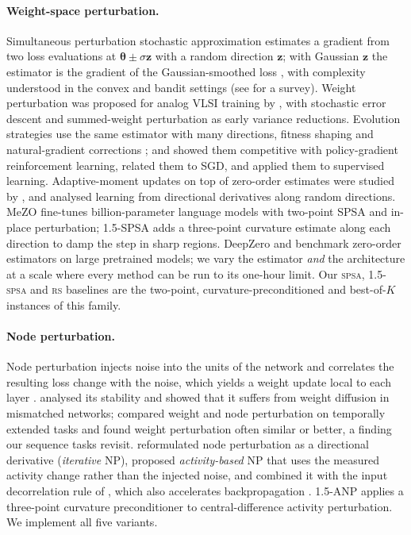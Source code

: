 \documentclass{article}
\newcommand{\method}[1]{\textsc{#1}}
\newcommand{\SPSA}{\method{spsa}}
\newcommand{\SPSAb}{\method{1.5-spsa}}
\newcommand{\RS}{\method{rs}}
\newcommand{\btheta}{\boldsymbol{\theta}}
\newcommand{\bz}{\mathbf{z}}
\begin{document}
\paragraph{Weight-space perturbation.}
Simultaneous perturbation stochastic approximation \citep{spall1992,spall1998}
estimates a gradient from two loss evaluations at $\btheta\pm\sigma\bz$ with a random
direction $\bz$; with Gaussian $\bz$ the estimator is the gradient of the
Gaussian-smoothed loss \citep{nesterov2017}, with complexity understood in the convex
\citep{duchi2015} and bandit \citep{flaxman2005} settings (see \citet{liu2020primer}
for a survey). Weight perturbation was proposed for analog VLSI training by \citet{jabri1992weight},
with stochastic error descent \citep{cauwenberghs1993fast} and summed-weight
perturbation \citep{flower1993summed} as early variance reductions. Evolution strategies
use the same estimator with many directions, fitness shaping and natural-gradient
corrections \citep{wierstra2014,hansen2003,hansen2016}; \citet{salimans2017} and
\citet{mania2018} showed them competitive with policy-gradient reinforcement learning,
\citet{zhang2017relationship} related them to SGD, and \citet{lenc2019non} applied them
to supervised learning. Adaptive-moment updates on top of zero-order estimates were
studied by \citet{chen2019zoadamm}, and \citet{silver2021learning} analysed learning
from directional derivatives along random directions. MeZO \citep{malladi2023} fine-tunes
billion-parameter language models with two-point SPSA and in-place perturbation;
1.5-SPSA \citep{chaubard2025spsa15} adds a three-point curvature estimate along each
direction to damp the step in sharp regions. DeepZero \citep{chen2024deepzero} and
\citet{zhang2024revisiting} benchmark zero-order estimators on large pretrained models; we vary
the estimator \emph{and} the architecture at a scale where every method can be run to
its one-hour limit. Our \SPSA{}, \SPSAb{} and \RS{} baselines are the two-point,
curvature-preconditioned and best-of-$K$ instances of this family.

\paragraph{Node perturbation.}
Node perturbation injects noise into the units of the network and correlates the
resulting loss change with the noise, which yields a weight update local to each layer
\citep{widrow1990,werfel2003,werfel2005,fiete2006}. \citet{hiratani2022} analysed its
stability and showed that it suffers from weight diffusion in mismatched networks;
\citet{zuge2023weight} compared weight and node perturbation on temporally extended
tasks and found weight perturbation often similar or better, a finding our sequence
tasks revisit. \citet{dalm2023} reformulated node perturbation as a directional
derivative (\emph{iterative} NP), proposed \emph{activity-based} NP that uses the
measured activity change rather than the injected noise, and combined it with the input
decorrelation rule of \citet{ahmad2023constrained}, which also accelerates
backpropagation \citep{dalm2024,ahmad2024}. 1.5-ANP \citep{chaubard2025anp15} applies a
three-point curvature preconditioner to central-difference activity perturbation. We
implement all five variants.
\end{document}
